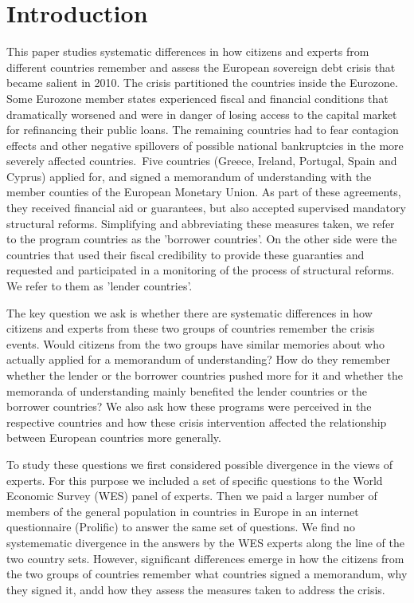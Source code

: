 \section{Introduction}
This paper studies systematic differences in how citizens and experts from
different countries remember and assess the European sovereign debt crisis
that became salient in 2010. The crisis partitioned the countries inside the
Eurozone. Some Eurozone member states experienced fiscal and financial
conditions that dramatically worsened and were in danger of losing access to
the capital market for refinancing their public loans. The remaining
countries had to fear contagion effects and other negative spillovers of
possible national bankruptcies in the more severely affected countries.\
Five countries (Greece, Ireland, Portugal, Spain and Cyprus) applied for,
and signed a memorandum of understanding with the member counties of the
European Monetary Union. As part of these agreements, they received
financial aid or guarantees, but also accepted supervised mandatory
structural reforms. Simplifying and abbreviating these measures taken, we
refer to the program countries as the 'borrower countries'. On the other
side were the countries that used their fiscal credibility to provide these
guaranties and requested and participated in a monitoring of the process of
structural reforms. We refer to them as 'lender countries'.

The key question we ask is whether there are systematic differences in how
citizens and experts from these two groups of countries remember the crisis
events. Would citizens from the two groups have similar memories about who
actually applied for a memorandum of understanding? How do they remember
whether the lender or the borrower countries pushed more for it and whether
the memoranda of understanding mainly benefited the lender countries or the
borrower countries? We also ask how these programs were perceived in the
respective countries and how these crisis intervention affected the
relationship between European countries more generally.\ 

To study these questions we first considered possible divergence in the
views of experts. For this purpose we included a set of specific questions
to the World Economic Survey (WES) panel of experts. Then we paid a larger
number of members of the general population in countries in Europe in an
internet questionnaire (Prolific) to answer the same set of questions. We
find no systemematic divergence in the answers by the WES experts along the
line of the two country sets. However, significant differences emerge in how
the citizens from the two groups of countries remember what countries signed
a memorandum, why they signed it, andd how they assess the measures taken to
address the crisis.  

